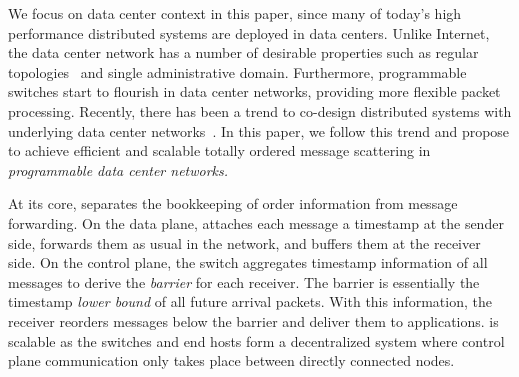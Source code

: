 We focus on data center context in this paper, since many of today's high performance distributed systems are deployed in data centers.
Unlike Internet, the data center network has a number of desirable properties such as regular topologies~\cite{leiserson1985fat,greenberg2009vl2} and single administrative domain. Furthermore, programmable switches start to flourish in data center networks, providing more flexible packet processing. Recently, there has been a trend to co-design distributed systems with underlying data center networks~\cite{eris,netcache-sosp17,dang2016paxos}. In this paper, we follow this trend and propose \sys to achieve efficient and scalable totally ordered message scattering in \emph{programmable data center networks.}
 



At its core, \sys separates the bookkeeping of order information from message forwarding. On the data plane, \sys attaches each message a timestamp at the sender side, forwards them as usual in the network, and buffers them at the receiver side. On the control plane, the switch aggregates timestamp information of all messages to derive the \textit{barrier} for each receiver. The barrier is essentially the timestamp \textit{lower bound} of all future arrival packets. With this information, the receiver reorders messages below the barrier and deliver them to applications. \sys is scalable as the switches and end hosts form a decentralized system where control plane communication only takes place between directly connected nodes.

